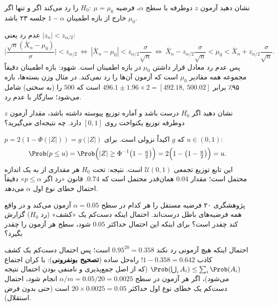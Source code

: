 \begin{exercise}
نشان دهید آزمون $z$ دوطرفه با سطح $\alpha$، فرضیه $H_0:\ \mu=\mu_0$ را رد می‌کند اگر و تنها اگر $\mu_0$ خارج از بازه اطمینان $1-\alpha$ جلسه ۲۳ باشد.
\end{exercise}
\begin{solution}
عدم رد یعنی $|z_n|<z_{\alpha/2}$:
\[
\Big|\frac{\sqrt n(\bar X_n-\mu_0)}{\sigma}\Big|<z_{\alpha/2}
\ \Longleftrightarrow\ |\bar X_n-\mu_0|<z_{\alpha/2}\frac{\sigma}{\sqrt n}
\ \Longleftrightarrow\ \bar X_n-z_{\alpha/2}\frac{\sigma}{\sqrt n}<\mu_0<\bar X_n+z_{\alpha/2}\frac{\sigma}{\sqrt n}.
\]
پس عدم رد معادل قرار داشتن $\mu_0$ در بازه اطمینان است. شهود: بازه اطمینان دقیقاً مجموعه همه مقادیر $\mu_0$ است که آزمون آن‌ها را رد نمی‌کند. در مثال وزن بسته‌ها، بازه ۹۵٪ برابر $496.1\pm1.96\times2=[492.18,\ 500.02]$ است که $500$ را (به سختی) شامل می‌شود؛ سازگار با عدم رد.
\end{solution}

\begin{exercise}
نشان دهید اگر $H_0$ درست باشد و آماره توزیع پیوسته داشته باشد، مقدار  آزمون $z$ دوطرفه توزیع یکنواخت روی $[0,1]$ دارد. چه نتیجه‌ای می‌گیرید؟
\end{exercise}
\begin{solution}
$p=2(1-\Phi(|Z|))=g(|Z|)$ که $g$ اکیداً نزولی است. برای $u\in(0,1)$:
\[
\Prob(p\le u)=\Prob\Big(|Z|\ge\Phi^{-1}\big(1-\tfrac u2\big)\Big)=2\Big(1-\big(1-\tfrac u2\big)\Big)=u .
\]
این تابع توزیع تجمعی $\mathcal U(0,1)$ است. نتیجه: تحت $H_0$ هر مقداری از  به یک اندازه محتمل است؛ مقدار $0.04$ همان‌قدر محتمل است که $0.74$. قانون «رد اگر $p\le\alpha$» دقیقاً احتمال خطای نوع اول $\alpha$ می‌دهد.
\end{solution}

\begin{exercise}
پژوهشگری ۲۰ فرضیه مستقل را هر کدام در سطح $\alpha=0.05$ آزمون می‌کند و در واقع همه فرضیه‌های باطل درست‌اند. احتمال اینکه دست‌کم یک «کشف» (رد $H_0$) گزارش کند چقدر است؟ برای اینکه این احتمال حداکثر $0.05$ شود، سطح هر آزمون را چقدر بگیرد؟
\end{exercise}
\begin{solution}
احتمال اینکه هیچ آزمونی رد نکند $0.95^{20}=0.358$ است؛ پس احتمال دست‌کم یک کشف کاذب $1-0.358=0.642$! راه‌حل ساده (\textbf{تصحیح بونفرونی}): با کران اجتماع $\Prob(\bigcup_iA_i)\le\sum_i\Prob(A_i)$ (که از اصل جمع‌پذیری و نامنفی بودن احتمال نتیجه می‌شود)، اگر هر آزمون در سطح $\alpha/m=0.05/20=0.0025$ انجام شود، احتمال دست‌کم یک خطای نوع اول حداکثر $20\times0.0025=0.05$ است (حتی بدون فرض استقلال).
\end{solution}

